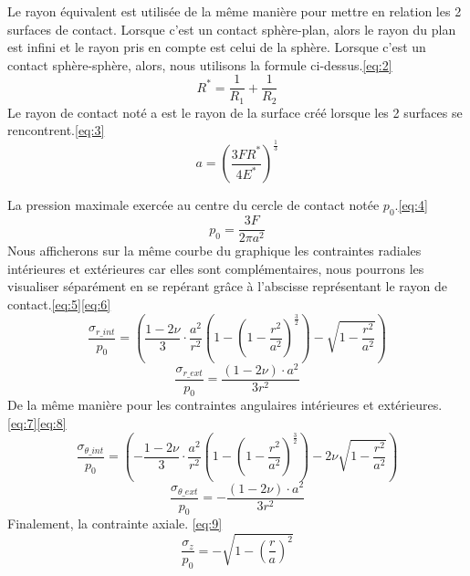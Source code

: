 \documentclass[a4paper,12pt]{article}
\begin{document}
Le rayon équivalent est utilisée de la même manière pour mettre en relation les 2 surfaces de contact. Lorsque c'est un contact sphère-plan, alors le rayon du plan est infini et le rayon pris en compte est celui de la sphère. Lorsque c'est un contact sphère-sphère, alors, nous utilisons la formule ci-dessus.\eqref{eq:2}\\
\begin{equation}
	R^* = \frac{1}{R_1} + \frac{1}{R_2}
	\label{eq:2}
\end{equation}
Le rayon de contact noté a est le rayon de la surface créé lorsque les 2 surfaces se rencontrent.\eqref{eq:3}
\begin{equation}
	a = \left(\frac{3 F R^*}{4 E^*}\right)^{\frac{1}{3}}
	\label{eq:3}
\end{equation}

\clearpage
La pression maximale exercée au centre du cercle de contact notée $p_0$.\eqref{eq:4}\\
\begin{equation}
	p_0 = \frac{3 F}{2 \pi a^2}
	\label{eq:4}
\end{equation}
Nous afficherons sur la même courbe du graphique les contraintes radiales intérieures et extérieures car elles sont complémentaires, nous pourrons les visualiser séparément en se repérant grâce à l'abscisse représentant le rayon de contact.\eqref{eq:5}\eqref{eq:6}
\begin{equation}
	\frac{\sigma_{r\_int}}{p_0} = \left( \frac{1 - 2 \nu}{3} \cdot \frac{a^2}{r^2} \left(1 - \left(1 - \frac{r^2}{a^2}\right)^{\frac{3}{2}}\right) - \sqrt{1 - \frac{r^2}{a^2}} \right)
	\label{eq:5}
\end{equation}
\begin{equation}
	\frac{\sigma_{r\_ext}}{p_0} = \frac{(1 - 2 \nu) \cdot a^2}{3 r^2}
	\label{eq:6}
\end{equation}
De la même manière pour les contraintes angulaires intérieures et extérieures.\eqref{eq:7}\eqref{eq:8}
\begin{equation}
	\frac{\sigma_{\theta\_int}}{p_0} = \left( -\frac{1 - 2 \nu}{3} \cdot \frac{a^2}{r^2} \left(1 - \left(1 - \frac{r^2}{a^2}\right)^{\frac{3}{2}}\right) - 2 \nu \sqrt{1 - \frac{r^2}{a^2}} \right)
	\label{eq:7}
\end{equation}
\begin{equation}
	\frac{\sigma_{\theta\_ext}}{p_0} = - \frac{(1 - 2 \nu) \cdot a^2}{3 r^2}
	\label{eq:8}
\end{equation}
Finalement, la contrainte axiale. \eqref{eq:9}
\begin{equation}
	\frac{\sigma_{z}}{p_0} = - \sqrt{1 - \left(\frac{r}{a}\right)^2}
	\label{eq:9}
\end{equation}
\end{document}
